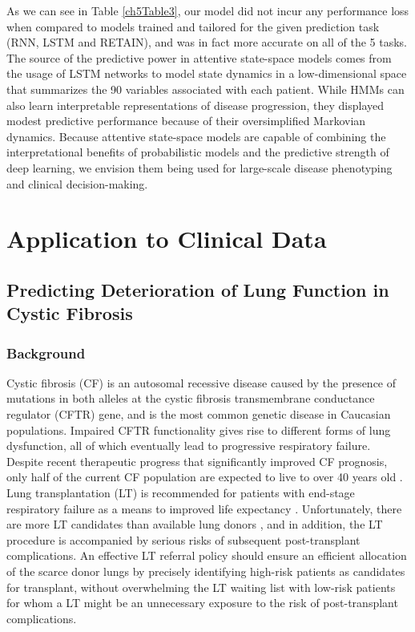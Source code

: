 \documentclass [PhD] {uclathes}
\begin{document}
As we can see in Table \ref{ch5Table3}, our model did not incur any performance loss when compared to models trained and tailored for the given prediction task (RNN, LSTM and RETAIN), and was in fact more accurate on all of the 5 tasks. The source of the predictive power in attentive state-space models comes from the usage of LSTM networks to model state dynamics in a low-dimensional space that summarizes the 90 variables associated with each patient. While HMMs can also learn interpretable representations of disease progression, they displayed modest predictive performance because of their oversimplified Markovian dynamics. Because attentive state-space models are capable of combining the interpretational benefits of probabilistic models and the predictive strength of deep learning, we envision them being used for large-scale disease phenotyping and clinical decision-making. 

\part{Application to Clinical Data}

\chapter{Predicting Deterioration of Lung Function in Cystic Fibrosis}
\section{Background}
\label{ch6sec0}
Cystic fibrosis (CF) is an autosomal recessive disease caused by the presence of mutations in both alleles at the cystic fibrosis transmembrane conductance regulator (CFTR) gene, and is the most common genetic disease in Caucasian populations\cite{adler2008genetic, fanen2014genetics}. Impaired CFTR functionality gives rise to different forms of lung dysfunction, all of which eventually lead to progressive respiratory failure\cite{mogayzel2014cystic, szczesniak2017phenotypes}. Despite recent therapeutic progress that significantly improved CF prognosis\cite{rowe2012progress}, only half of the current CF population are expected to live to over 40 years old \cite{mackenzie2014longevity}. Lung transplantation (LT) is recommended for patients with end-stage respiratory failure as a means to improved life expectancy \cite{flume1998cystic, liou2001survival, hofer2009true}. Unfortunately, there are more LT candidates than available lung donors \cite{flume1998cystic}, and in addition, the LT procedure is accompanied by serious risks of subsequent post-transplant complications\cite{mayer2002developing}. An effective LT referral policy should ensure an efficient allocation of the scarce donor lungs by precisely identifying high-risk patients as candidates for transplant, without overwhelming the LT waiting list with low-risk patients for whom a LT might be an unnecessary exposure to the risk of post-transplant complications\cite{liou2005use}.    
\end{document}
